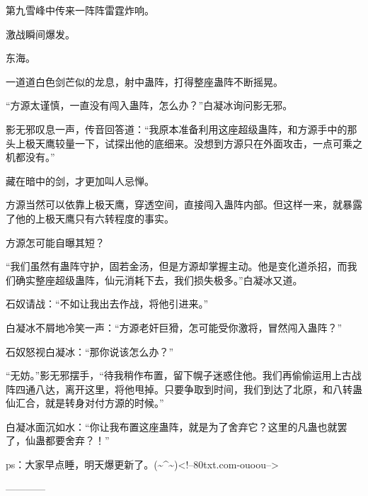 \begin{this_body}
第九雪峰中传来一阵阵雷霆炸响。

激战瞬间爆发。

东海。

一道道白色剑芒似的龙息，射中蛊阵，打得整座蛊阵不断摇晃。

“方源太谨慎，一直没有闯入蛊阵，怎么办？”白凝冰询问影无邪。

影无邪叹息一声，传音回答道：“我原本准备利用这座超级蛊阵，和方源手中的那头上极天鹰较量一下，试探出他的底细来。没想到方源只在外面攻击，一点可乘之机都没有。”

藏在暗中的剑，才更加叫人忌惮。

方源当然可以依靠上极天鹰，穿透空间，直接闯入蛊阵内部。但这样一来，就暴露了他的上极天鹰只有六转程度的事实。

方源怎可能自曝其短？

“我们虽然有蛊阵守护，固若金汤，但是方源却掌握主动。他是变化道杀招，而我们确实整座超级蛊阵，仙元消耗下去，我们损失极多。”白凝冰又道。

石奴请战：“不如让我出去作战，将他引进来。”

白凝冰不屑地冷笑一声：“方源老奸巨猾，怎可能受你激将，冒然闯入蛊阵？”

石奴怒视白凝冰：“那你说该怎么办？”

“无妨。”影无邪摆手，“待我稍作布置，留下幌子迷惑住他。我们再偷偷运用上古战阵四通八达，离开这里，将他甩掉。只要争取到时间，我们到达了北原，和八转蛊仙汇合，就是转身对付方源的时候。”

白凝冰面沉如水：“你让我布置这座蛊阵，就是为了舍弃它？这里的凡蛊也就罢了，仙蛊都要舍弃？！”

ps：大家早点睡，明天爆更新了。(\~{}\^{}\~{})<!--80txt.com-ouoou-->

------------

\end{this_body}

